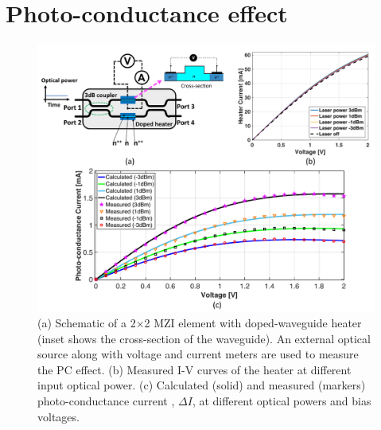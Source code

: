 \section{Photo-conductance effect}

\begin{figure}[t!]
\centering\includegraphics[width=12.5cm]{Chapter5/fig1_MB_v2.pdf}
\caption{(a) Schematic of a 2$\times$2 MZI element with doped-waveguide heater (inset shows the cross-section of the waveguide). An external optical source along with voltage and current meters are used to measure the PC effect. (b) Measured I-V curves of the heater at different input optical power. (c) Calculated (solid) and measured (markers) photo-conductance current , $\Delta I$, at different optical powers and bias voltages.}
\end{figure}

